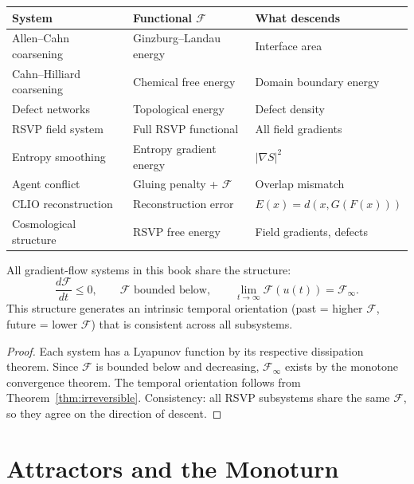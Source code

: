 \begin{center}
\begin{tabular}{@{}lll@{}}
\toprule
\textbf{System} & \textbf{Functional $\mathcal{F}$} &
\textbf{What descends} \\
\midrule
Allen--Cahn coarsening & Ginzburg--Landau energy &
Interface area \\
Cahn--Hilliard coarsening & Chemical free energy &
Domain boundary energy \\
Defect networks & Topological energy &
Defect density \\
RSVP field system & Full RSVP functional &
All field gradients \\
Entropy smoothing & Entropy gradient energy &
$|\nabla S|^2$ \\
Agent conflict & Gluing penalty + $\mathcal{F}$ &
Overlap mismatch \\
CLIO reconstruction & Reconstruction error &
$E(x) = d(x,G(F(x)))$ \\
Cosmological structure & RSVP free energy &
Field gradients, defects \\
\bottomrule
\end{tabular}
\end{center}

\begin{theorem}
  \label{thm:descent-principle}
  \statusproven{}
  All gradient-flow systems in this book share the structure:
  \[
    \frac{d\mathcal{F}}{dt} \leq 0,
    \qquad
    \mathcal{F} \text{ bounded below},
    \qquad
    \lim_{t\to\infty}\mathcal{F}(u(t)) = \mathcal{F}_\infty.
  \]
  This structure generates an intrinsic temporal orientation
  (past = higher $\mathcal{F}$, future = lower $\mathcal{F}$)
  that is consistent across all subsystems.
\end{theorem}

\begin{proof}
  Each system has a Lyapunov function by its respective
  dissipation theorem.
  Since $\mathcal{F}$ is bounded below and decreasing,
  $\mathcal{F}_\infty$ exists by the monotone convergence theorem.
  The temporal orientation follows from Theorem~\ref{thm:irreversible}.
  Consistency: all RSVP subsystems share the same $\mathcal{F}$,
  so they agree on the direction of descent.
\end{proof}

\section{Attractors and the Monoturn}

